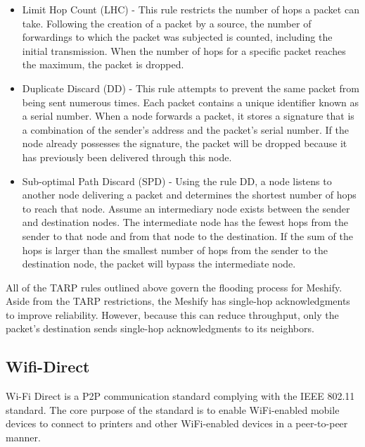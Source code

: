 \begin{itemize}
    \item Limit Hop Count (LHC) - This rule restricts the number of hops a
          packet can take. Following the creation of a packet by a source, the
          number of
          forwardings to which the packet was subjected is counted, including
          the initial
          transmission. When the number of hops for a specific packet reaches
          the
          maximum, the packet is dropped.

    \item Duplicate Discard (DD) - This rule attempts to prevent the same
          packet from being sent numerous times. Each packet contains a unique
          identifier
          known as a serial number. When a node forwards a packet, it stores a
          signature
          that is a combination of the sender's address and the packet's serial
          number.
          If the node already possesses the signature, the packet will be
          dropped because
          it has previously been delivered through this node.

    \item Sub-optimal Path Discard (SPD) - Using the rule DD, a node listens to
          another node delivering a packet and determines the shortest number
          of hops to
          reach that node. Assume an intermediary node exists between the
          sender and
          destination nodes. The intermediate node has the fewest hops from the
          sender to
          that node and from that node to the destination. If the sum of the
          hops is
          larger than the smallest number of hops from the sender to the
          destination
          node, the packet will bypass the intermediate node.

\end{itemize}

All of the TARP rules outlined above govern the flooding process for Meshify.
Aside from the TARP restrictions, the Meshify has single-hop acknowledgments to
improve reliability. However, because this can reduce throughput, only the
packet's destination sends single-hop acknowledgments to its
neighbors\cite{gunasekara2022}.

\subsection{Wifi-Direct}

Wi-Fi Direct is a P2P communication standard complying with the IEEE 802.11
standard. The core purpose of the standard is to enable WiFi-enabled mobile
devices to connect to printers and other WiFi-enabled devices in a peer-to-peer
manner\cite{malar2023}.

